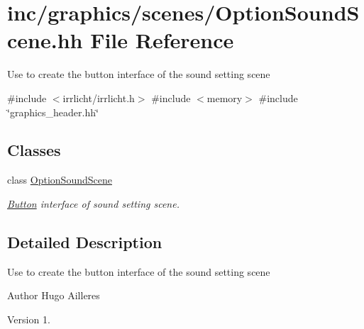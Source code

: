 \hypertarget{OptionSoundScene_8hh}{}\section{inc/graphics/scenes/\+Option\+Sound\+Scene.hh File Reference}
\label{OptionSoundScene_8hh}


Use to create the button interface of the sound setting scene  


{\ttfamily \#include $<$irrlicht/irrlicht.\+h$>$}\newline
{\ttfamily \#include $<$memory$>$}\newline
{\ttfamily \#include \char`\"{}graphics\+\_\+header.\+hh\char`\"{}}\newline
\subsection*{Classes}
\begin{DoxyCompactItemize}
\item 
class \hyperlink{classOptionSoundScene}{Option\+Sound\+Scene}
\begin{DoxyCompactList}\small\item\em \hyperlink{classButton}{Button} interface of sound setting scene. \end{DoxyCompactList}\end{DoxyCompactItemize}


\subsection{Detailed Description}
Use to create the button interface of the sound setting scene 

\begin{DoxyAuthor}{Author}
Hugo Ailleres 
\end{DoxyAuthor}
\begin{DoxyVersion}{Version}
1. 
\end{DoxyVersion}
